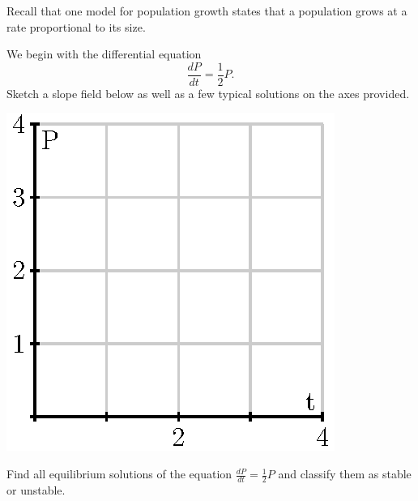 \begin{pa} \label{PA:7.4} Recall that one model for population growth states that a population grows at a rate proportional to its size.

  \ba
\item We begin with the differential equation 
  $$
  \frac{dP}{dt} = \frac12 P.
  $$
  Sketch a slope field below as well as a few typical solutions on the axes provided.

  \begin{center}
    \includegraphics{figures/7_6_preview.eps}
  \end{center}

\item Find all equilibrium solutions of the equation $\frac{dP}{dt} = \frac12 P$ and classify them as stable or
  unstable.  


\end{pa}
